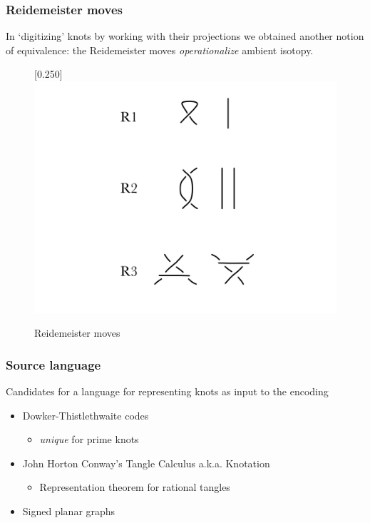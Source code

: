 \documentclass{beamer}
\begin{document}
\begin{frame}
  \frametitle{Reidemeister moves}    
  In `digitizing' knots by working with their projections we obtained
  another notion of equivalence: the Reidemeister moves
  \textit{operationalize} ambient isotopy.
  \begin{figure}[tbp]
    \centering
    \scalebox{0.25}[0.250]{\includegraphics[viewport=0 75 700 525]{ReidemeisterMoves12321072006}}
    \caption{ Reidemeister moves }
  \end{figure}
\end{frame}

\begin{frame}
  \frametitle{Source language}
  Candidates for a language for representing knots as input to the encoding
  \begin{itemize}
    \item Dowker-Thistlethwaite codes
      \begin{itemize}
        \item \textit{unique} for prime knots
      \end{itemize}
    \item John Horton Conway's Tangle Calculus a.k.a. Knotation
      \begin{itemize}
        \item Representation theorem for rational tangles
      \end{itemize}
    \item Signed planar graphs
  \end{itemize}
\end{frame}
\end{document}
